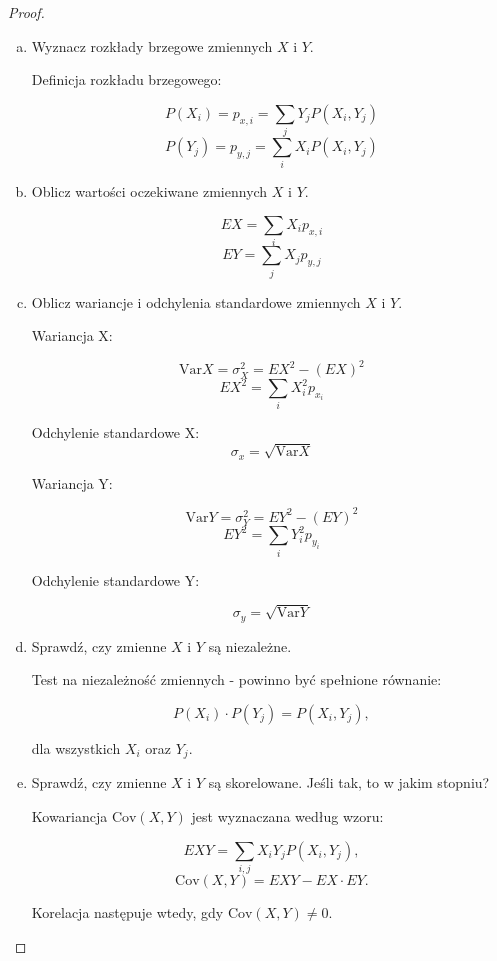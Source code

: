 \documentclass[11pt]{article}
\theoremstyle{definition}
\newcommand{\Var}{\text{Var}}
\newcommand{\Cov}{\text{Cov}}
\begin{document}
\begin{proof}
    \begin{enumerate}[a)]
        \item Wyznacz rozkłady brzegowe zmiennych $X$ i $Y$.

              Definicja rozkładu brzegowego:

              $$P(X_i) = p_{x,i} = \sum_j Y_jP(X_i,Y_j)$$
              $$P(Y_j) = p_{y,j}= \sum_i X_iP(X_i,Y_j)$$

        \item Oblicz wartości oczekiwane zmiennych $X$ i $Y$.

              $$EX = \sum_i X_ip_{x,i}$$
              $$EY = \sum_j X_jp_{y,j}$$

        \item Oblicz wariancje i odchylenia standardowe zmiennych $X$ i $Y$.

              Wariancja X:

              $$\Var X = \sigma_X^2  =EX^2 - (EX)^2$$
              $$EX^2 = \sum_i X_i^2p_{x_i}$$

              Odchylenie standardowe X:
              $$\sigma_x = \sqrt{\Var X}$$

              Wariancja Y:

              $$\Var Y = \sigma_Y^2  =EY^2 - (EY)^2$$
              $$EY^2 = \sum_i Y_i^2p_{y_i}$$

              Odchylenie standardowe Y:

              $$\sigma_y = \sqrt{\Var Y}$$

        \item Sprawdź, czy zmienne $X$ i $Y$ są niezależne.

              Test na niezależność zmiennych - powinno być spełnione równanie:

              $$P(X_i)\cdot P(Y_j) = P(X_i,Y_j),$$

              dla wszystkich $X_i$ oraz $Y_j$.

        \item Sprawdź, czy zmienne $X$ i $Y$ są skorelowane. Jeśli tak, to w jakim stopniu?

              Kowariancja $\Cov(X,Y)$ jest wyznaczana według wzoru:

              $$EXY = \sum_{i,j} X_iY_jP(X_i,Y_j),$$
              $$\Cov(X,Y) = EXY - EX\cdot EY.$$

              Korelacja następuje wtedy, gdy $\Cov(X,Y)\neq 0$.


\end{enumerate}
\end{proof}
\end{document}
